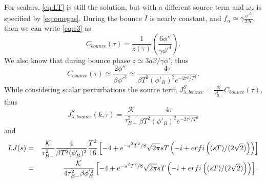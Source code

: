 \documentclass[12pt,a4paper]{article}
\newcommand{\bea}{\begin{eqnarray}}
\newcommand{\eea}{\end{eqnarray}}
\numberwithin{equation}{section}
\numberwithin{equation}{section}
\begin{document}
For scalars, \eqref{eq:LT} is still the solution, but with a different source term and $\omega_S$ is specified by \eqref{eq:omegas}. During the bounce $I$ is nearly constant, and $f_{\alpha} \simeq \gamma \frac{\phi'^3}{2\mathcal{H}}$, then we can write \eqref{eq:c3} as
\begin{equation}
    C_{bounce}(\tau) = \frac{1}{z(\tau)}\left(\frac{6 \phi''}{\gamma \phi'^4}\right).
\end{equation}
We also know that during bounce phase $z\simeq 3 a\beta/\gamma \phi' $, thus
\begin{equation}
    C_{bounce}(\tau) \simeq  \frac{2\phi''}{ \beta \phi'^3}  \simeq  \frac{4\tau}{\beta T^2 (\phi'_B)^2 e^{-2\tau^2/T^2}}.
\end{equation}
While considering scalar perturbations the source term $J^S_{\lambda,bounce}=\frac{\mathcal{K}}{\tau^4_{B-}}  C_{bounce}(\tau)$, thus 
\begin{equation}
    J^S_{\lambda,bounce}(k,\tau) = \frac{\mathcal{K}}{\tau^2_{B-}}   \frac{4\tau}{\beta T^2 (\phi'_B)^2 e^{-2\tau^2/T^2}}
\end{equation}
and
\bea
    LJ(s) &=& \frac{\mathcal{K}}{\tau^2_{B-}} \frac{4}{\beta T^2 (\phi'_B)^2} \frac{T^2}{16} \left[-4 + 
   e^{- s^2 T^2/8} \sqrt{2 \pi} s T\left( -i + erfi\left((s T)/(2 \sqrt{2})\right)\right)\right]\cr 
    &=&\frac{\mathcal{K}}{4\tau^2_{B-}\beta\phi^{'2}_B} \left[-4 + 
   e^{- s^2 T^2/8} \sqrt{2 \pi} s T\left( -i + erfi\left((s T)/(2 \sqrt{2})\right)\right)\right]. 
\eea
\end{document}
